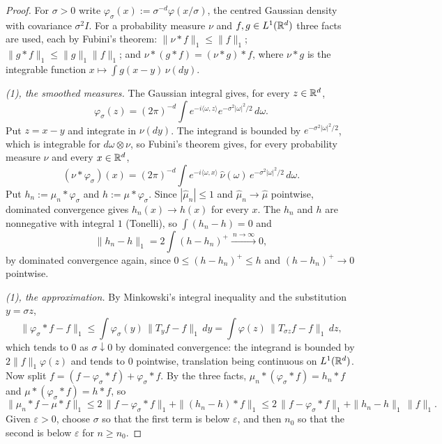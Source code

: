 \begin{proof}
\leanok
For $\sigma > 0$ write $\varphi_\sigma(x) := \sigma^{-d}\varphi(x/\sigma)$, the centred Gaussian density
with covariance $\sigma^2I$. For a probability measure $\nu$ and $f, g \in L^1(\mathbb{R}^d)$ three facts are
used, each by Fubini's theorem: $\|\nu * f\|_1 \le \|f\|_1$; $\|g * f\|_1 \le \|g\|_1\|f\|_1$; and
$\nu * (g * f) = (\nu * g) * f$, where $\nu * g$ is the integrable function
$x \mapsto \int g(x - y)\,\nu(dy)$.

\emph{(1), the smoothed measures.} The Gaussian integral gives, for every $z \in \mathbb{R}^d$,
\[
  \varphi_\sigma(z) = (2\pi)^{-d}\int e^{-i\langle\omega,z\rangle}e^{-\sigma^2|\omega|^2/2}\,d\omega .
\]
Put $z = x - y$ and integrate in $\nu(dy)$. The integrand is bounded by $e^{-\sigma^2|\omega|^2/2}$,
which is integrable for $d\omega \otimes \nu$, so Fubini's theorem gives, for every probability
measure $\nu$ and every $x \in \mathbb{R}^d$,
\[
  (\nu * \varphi_\sigma)(x) = (2\pi)^{-d}\int e^{-i\langle\omega,x\rangle}\,\widehat\nu(\omega)\,
  e^{-\sigma^2|\omega|^2/2}\,d\omega .
\]
Put $h_n := \mu_n * \varphi_\sigma$ and $h := \mu * \varphi_\sigma$. Since $|\widehat\mu_n| \le 1$ and
$\widehat\mu_n \to \widehat\mu$ pointwise, dominated convergence gives $h_n(x) \to h(x)$ for every
$x$. The $h_n$ and $h$ are nonnegative with integral $1$ (Tonelli), so $\int(h_n - h) = 0$ and
\[
  \|h_n - h\|_1 = 2\int(h - h_n)^+ \xrightarrow{\ n \to \infty\ } 0 ,
\]
by dominated convergence again, since $0 \le (h - h_n)^+ \le h$ and $(h - h_n)^+ \to 0$ pointwise.

\emph{(1), the approximation.} By Minkowski's integral inequality and the substitution $y = \sigma z$,
\[
  \|\varphi_\sigma * f - f\|_1 \le \int\varphi_\sigma(y)\,\|T_yf - f\|_1\,dy
  = \int\varphi(z)\,\|T_{\sigma z}f - f\|_1\,dz ,
\]
which tends to $0$ as $\sigma \downarrow 0$ by dominated convergence: the integrand is bounded by
$2\|f\|_1\varphi(z)$ and tends to $0$ pointwise, translation being continuous on $L^1(\mathbb{R}^d)$. Now
split $f = (f - \varphi_\sigma * f) + \varphi_\sigma * f$. By the three facts,
$\mu_n * (\varphi_\sigma * f) = h_n * f$ and $\mu * (\varphi_\sigma * f) = h * f$, so
\[
  \|\mu_n * f - \mu * f\|_1 \le 2\,\|f - \varphi_\sigma * f\|_1 + \|(h_n - h) * f\|_1
  \le 2\,\|f - \varphi_\sigma * f\|_1 + \|h_n - h\|_1\,\|f\|_1 .
\]
Given $\varepsilon > 0$, choose $\sigma$ so that the first term is below $\varepsilon$, and then $n_0$ so
that the second is below $\varepsilon$ for $n \ge n_0$.


\end{proof}

